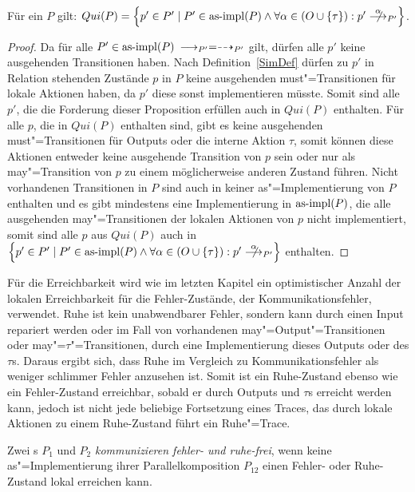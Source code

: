 \begin{Prop}
  Für ein \MEIO{} $P$ gilt: $Qui(P) = \left\{p'\in P'\mid P'\in\asimp (P)\land
  \forall\alpha\in (O\cup\{\tau\}):p' \nmust[\alpha]_{P'}\right\}$.
\end{Prop}
\begin{proof}
  Da für alle $P'\in\mathrm{as}\text{-}\mathrm{impl} (P)$ $\must_{P'} =\may_{P'}$ gilt, dürfen alle $p'$
  keine ausgehenden Transitionen haben. Nach Definition~\ref{SimDef} dürfen zu
  $p'$ in Relation stehenden Zustände $p$ in $P$ keine ausgehenden
  must"=Transitionen für lokale Aktionen haben, da $p'$ diese sonst implementieren müsste. Somit
  sind alle $p'$, die die Forderung dieser Proposition erfüllen auch in $Qui
  (P)$ enthalten. Für alle $p$, die in $Qui (P)$ enthalten sind, gibt es keine
  ausgehenden must"=Transitionen für Outputs oder die interne Aktion $\tau$,
  somit können diese Aktionen entweder keine ausgehende Transition von $p$ sein
  oder nur als may"=Transition von $p$ zu einem möglicherweise anderen Zustand
  führen. Nicht vorhandenen Transitionen in $P$ sind auch in keiner
  as"=Implementierung von $P$ enthalten und es gibt mindestens eine
  Implementierung in $\mathrm{as}\text{-}\mathrm{impl} (P)$, die alle ausgehenden may"=Transitionen der
  lokalen Aktionen von $p$ nicht implementiert, somit sind alle $p$ aus $Qui
  (P)$ auch in $\left\{p'\in P'\mid P'\in\asimp (P)\land \forall\alpha\in
  (O\cup\{\tau\}):p' \nmust[\alpha]_{P'}\right\}$ enthalten.
\end{proof}

Für die Erreichbarkeit wird wie im letzten Kapitel ein optimistischer Anzahl
der lokalen Erreichbarkeit für die Fehler-Zustände, der Kommunikationsfehler,
verwendet. Ruhe ist kein unabwendbarer Fehler, sondern kann durch einen Input
repariert werden oder im Fall von vorhandenen may"=Output"=Transitionen oder
may"=$\tau$"=Transitionen, durch eine Implementierung dieses Outputs oder des
$\tau$s. Daraus ergibt sich, dass Ruhe im Vergleich
zu Kommunikationsfehler als weniger \glqq schlimmer Fehler\grqq{} anzusehen
ist. Somit ist ein Ruhe-Zustand ebenso wie ein Fehler-Zustand erreichbar,
sobald er durch Outputs und $\tau$s erreicht werden kann, jedoch ist nicht jede
beliebige Fortsetzung eines Traces, das durch lokale Aktionen zu einem
Ruhe-Zustand führt ein Ruhe"=Trace.

\begin{Def}
  Zwei \MEIO{}s $P_1$ und $P_2$ \emph{kommunizieren fehler- und ruhe-frei},
  wenn keine as"=Implementierung ihrer Parallelkomposition $P_{12}$ einen
  Fehler- oder Ruhe-Zustand lokal erreichen kann.
\end{Def}

